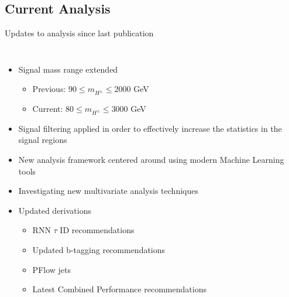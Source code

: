 \documentclass[aspectratio=169,xcolor=table]{beamer}
\begin{document}
  \subsection{Current Analysis}

    \begin{frame}[t]{Updates to analysis since last publication}
      \begin{columns}
        \begin{itemize}
          \item Signal mass range extended 
          \begin{itemize}
            \item Previous: $90 \leq m_{H^{\pm}} \leq 2000$ GeV
            \item Current:  $80 \leq m_{H^{\pm}} \leq 3000$ GeV
          \end{itemize}
          \item Signal filtering applied in order to effectively increase the statistics in the signal regions
          \item New analysis framework centered around using modern Machine Learning tools
          \item Investigating new multivariate analysis techniques
          \item Updated derivations
          \vspace{-3.5mm}
          \begin{multicols}{2}
            \begin{itemize}
              \tiny
              \item RNN $\tau$ ID recommendations
              \item Updated b-tagging recommendations
              \item PFlow jets
              \item Latest Combined Performance recommendations
            \end{itemize}
          \end{multicols}
        \end{itemize}


\end{columns}
\end{frame}
\end{document}
